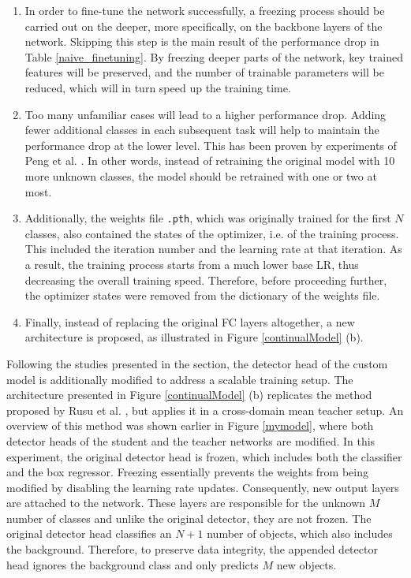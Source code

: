 \begin{enumerate}
\item In order to fine-tune the network successfully, a freezing process should be carried out on the deeper, more specifically, on the backbone layers of the network. Skipping this step is the main result of the performance drop in Table \ref{naive_finetuning}. By freezing deeper parts of the network, key trained features will be preserved, and the number of trainable parameters will be reduced, which will in turn speed up the training time. 
\item Too many unfamiliar cases will lead to a higher performance drop. Adding fewer additional classes in each subsequent task will help to maintain the performance drop at the lower level. This has been proven by experiments of Peng et al. \cite{Peng2020}. In other words, instead of retraining the original model with 10 more unknown classes, the model should be retrained with one or two at most. 
\item Additionally, the weights file \texttt{.pth}, which was originally trained for the first $N$ classes, also contained the states of the optimizer, i.e. of the training process. This included the iteration number and the learning rate at that iteration. As a result, the training process starts from a much lower base LR, thus decreasing the overall training speed. Therefore, before proceeding further, the optimizer states were removed from the dictionary of the weights file. 
\item Finally, instead of replacing the original FC layers altogether, a new architecture is proposed, as illustrated in Figure \ref{continualModel} (b). 
\end{enumerate}

Following the studies presented in the  section, the detector head of the custom model is additionally modified to address a scalable training setup. The architecture presented in Figure \ref{continualModel} (b) replicates the method proposed by Rusu et al. \cite{Rusu2016}, but applies it in a cross-domain mean teacher setup. An overview of this method was shown earlier in Figure \ref{mymodel}, where both detector heads of the student and the teacher networks are modified. In this experiment, the original detector head is frozen, which includes both the classifier and the box regressor. Freezing essentially prevents the weights from being modified by disabling the learning rate updates. Consequently, new output layers are attached to the network. These layers are responsible for the unknown $M$ number of classes and unlike the original detector, they are not frozen. The original detector head classifies an $N+1$ number of objects, which also includes the background. Therefore, to preserve data integrity, the appended detector head ignores the background class and only predicts $M$ new objects. 


